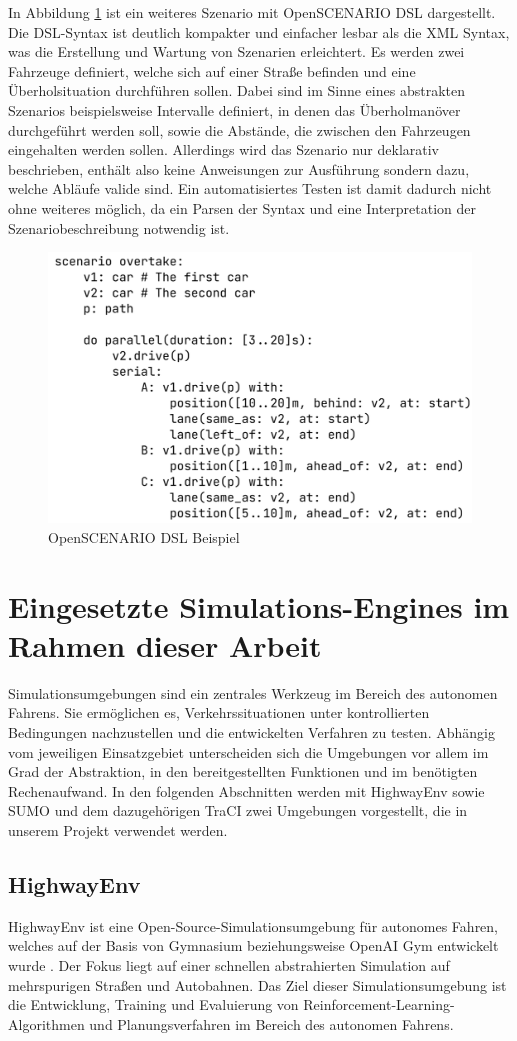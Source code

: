 In Abbildung \ref{fig:osl-dsl} ist ein weiteres Szenario mit OpenSCENARIO DSL dargestellt.
Die DSL-Syntax ist deutlich kompakter und einfacher lesbar als die XML Syntax, was die Erstellung und Wartung von Szenarien erleichtert.
Es werden zwei Fahrzeuge definiert, welche sich auf einer Straße befinden und eine Überholsituation durchführen sollen.
Dabei sind im Sinne eines abstrakten Szenarios beispielsweise Intervalle definiert, in denen das Überholmanöver durchgeführt werden soll, sowie die Abstände, die zwischen den Fahrzeugen eingehalten werden sollen.
Allerdings wird das Szenario nur deklarativ beschrieben, enthält also keine Anweisungen zur Ausführung sondern dazu, welche Abläufe valide sind.
Ein automatisiertes Testen ist damit dadurch nicht ohne weiteres möglich, da ein Parsen der Syntax und eine Interpretation der Szenariobeschreibung notwendig ist. 

\begin{figure}[h]
    \centering
    \includegraphics[width=0.6\linewidth]{contents/figures/openscenario_dsl.png}
    \caption{OpenSCENARIO DSL Beispiel \cite{EinfuehrungIntegrationsprojekt}}
    \label{fig:osl-dsl}
\end{figure}

\section{Eingesetzte Simulations-Engines im Rahmen dieser Arbeit}
Simulationsumgebungen sind ein zentrales Werkzeug im Bereich des autonomen Fahrens. Sie ermöglichen es, Verkehrssituationen unter kontrollierten Bedingungen nachzustellen und die entwickelten Verfahren zu testen. Abhängig vom jeweiligen Einsatzgebiet unterscheiden sich die Umgebungen vor allem im Grad der Abstraktion, in den bereitgestellten Funktionen und im benötigten Rechenaufwand. In den folgenden Abschnitten werden mit HighwayEnv sowie SUMO und dem dazugehörigen TraCI zwei Umgebungen vorgestellt, die in unserem Projekt verwendet werden.
\subsection{HighwayEnv}
HighwayEnv ist eine Open-Source-Simulationsumgebung für autonomes Fahren, welches auf der Basis von Gymnasium beziehungsweise OpenAI Gym entwickelt wurde \cite{highway-env}. Der Fokus liegt auf einer schnellen abstrahierten Simulation auf mehrspurigen Straßen und Autobahnen. Das Ziel dieser Simulationsumgebung ist die Entwicklung, Training und Evaluierung von Reinforcement-Learning-Algorithmen und Planungsverfahren im Bereich des autonomen Fahrens.

